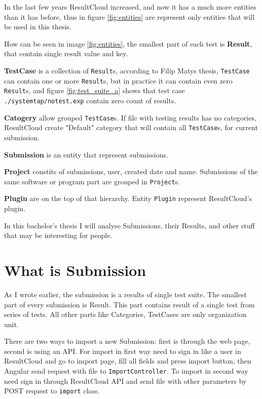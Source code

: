 In the last few years ResultCloud increased, and now it has a much more entities than it has before, thus in figure \ref{fig:entities} are represent only entities that will be used in this thesis.

How can be seen in image \ref{fig:entities}, the smallest part of each test is \textbf{Result}, that contain single result value and key. 

\textbf{TestCase} is a collection of \texttt{Result}s, according to Filip Matys thesis, \texttt{TestCase} can contain one or more \texttt{Result}s, but in practice it can contain even zero \texttt{Result}s, and figure \ref{fig:test_suite_a} shows that test case \texttt{./systemtap/notest.exp} contain zero count of results.

\textbf{Catogery} allow grouped \texttt{TestCase}s. If file with testing results has no categories, ResultCloud create "Default" category that will contain all \texttt{TestCase}s, for current submission.

\textbf{Submission} is an entity that represent submissions.

\textbf{Project} constits of submissions, user, created date and name. Submissions of the same software or program part are grouped in \texttt{Project}s.

\textbf{Plugin} are on the top of that hierarchy. Entity \texttt{Plugin} represent ResultCloud's plugin. 

In this bachelor's thesis I will analyse Submissions, their Results, and other stuff that may be interesting for people.

\section{What is Submission}

As I wrote earlier, the submission is a results of single test suite. The smallest part of every submission is Result. This part contains result of a single test from series of tests. All other parts like Categories, TestCases are only organization unit. 

There are two ways to import a new Submission: first is through the web page, second is using an API. For import in first way need to sign in like a user in ResultCloud and go to import page, fill all fields and press import button, then Angular send request with file to \texttt{ImportController}. To import in second way need sign in through ResultCloud API and send file with other parameters by POST request to \texttt{import} class. 

